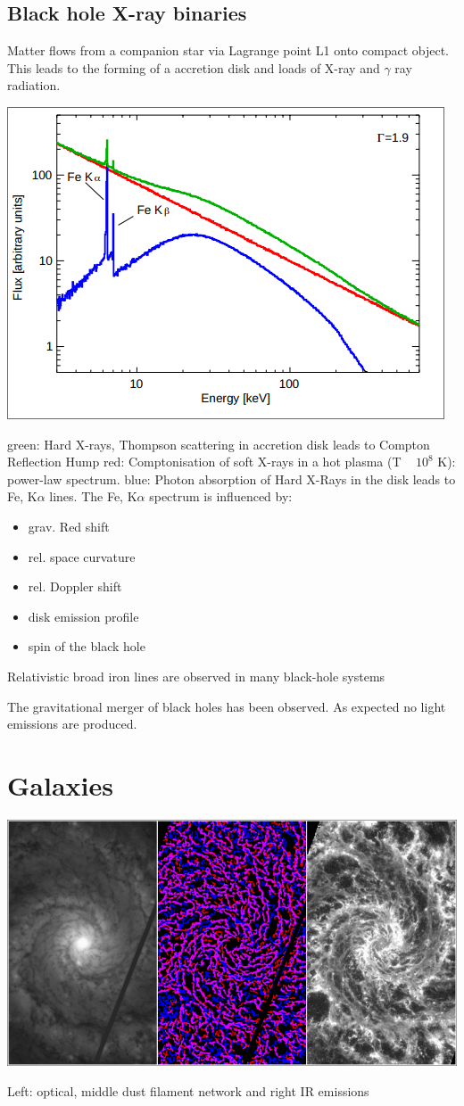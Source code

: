 \documentclass[11pt,a4paper]{article}
\begin{document}
\subsection{Black hole X-ray binaries}
Matter flows from a companion star via Lagrange point L1 onto compact object.
This leads to the forming of a accretion disk and loads of X-ray and $\gamma$ ray radiation.
\begin{center}
    \includegraphics[width=0.5\linewidth]{screenshot_2024-01-24-113302.png}
\end{center}
green: Hard X-rays, Thompson scattering in accretion disk leads to Compton Reflection Hump
red: Comptonisation of soft X-rays in a hot plasma (T ~ $10^8$ K): power-law spectrum.
blue: Photon absorption of Hard X-Rays in the disk leads to Fe, K$\alpha$ lines. 
The Fe, K$\alpha$ spectrum is influenced by:
\begin{itemize}
    \item grav. Red shift
    \item rel. space curvature 
    \item rel. Doppler shift
    \item disk emission profile
    \item spin of the black hole
\end{itemize}
Relativistic broad iron
lines are observed in
many black-hole systems

The gravitational merger of black holes has been observed.
As expected no light emissions are produced. 

\section{Galaxies}
\begin{center}
    \includegraphics[width=1\linewidth]{screenshot_2024-01-24-120045.png}
\end{center}
Left: optical, middle dust filament network and right IR emissions
\end{document}
